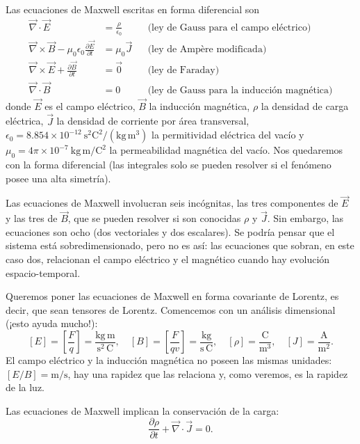 Las ecuaciones de Maxwell escritas en forma diferencial son
\[
\begin{aligned}
\vec\nabla\cdot\vec E &= \frac{\rho}{\epsilon_0} &&\text{(ley de Gauss
para el campo eléctrico)}\\
\vec\nabla\times\vec B-\mu_0\epsilon_0\frac{\partial\vec E}{\partial t}
&= \mu_0\vec J &&\text{(ley de Ampère modificada)}\\
\vec\nabla\times\vec E+\frac{\partial\vec B}{\partial t} &= \vec 0
&&\text{(ley de Faraday)}\\
\vec\nabla\cdot\vec B &= 0 &&\text{(ley de Gauss para la inducción
magnética)}
\end{aligned} \tag{23}
\]
donde $\vec E$ es el campo eléctrico, $\vec B$ la inducción magnética,
$\rho$ la densidad de carga eléctrica, $\vec J$ la densidad de corriente
por área transversal, $\epsilon_0=8.854\times10^{-12}\ \text{s}^2\text{C}^2/
(\text{kg}\,\text{m}^3)$ la permitividad eléctrica del vacío y
$\mu_0=4\pi\times10^{-7}\ \text{kg}\,\text{m}/\text{C}^2$ la
permeabilidad magnética del vacío. Nos quedaremos con la forma
diferencial (las integrales solo se pueden resolver si el fenómeno posee
una alta simetría).

Las ecuaciones de Maxwell involucran seis incógnitas, las tres
componentes de $\vec E$ y las tres de $\vec B$, que se pueden resolver si
son conocidas $\rho$ y $\vec J$. Sin embargo, las ecuaciones son ocho
(dos vectoriales y dos escalares). Se podría pensar que el sistema está
sobredimensionado, pero no es así: las ecuaciones que sobran, en este
caso dos, relacionan el campo eléctrico y el magnético cuando hay
evolución espacio-temporal.

Queremos poner las ecuaciones de Maxwell en forma covariante de Lorentz,
es decir, que sean tensores de Lorentz. Comencemos con un análisis
dimensional (¡esto ayuda mucho!):
\[
[E]=\left[\frac Fq\right]=\frac{\text{kg}\,\text{m}}{\text{s}^2\,
\text{C}}, \quad [B]=\left[\frac{F}{qv}\right]=\frac{\text{kg}}{\text{s}\,
\text{C}}, \quad [\rho]=\frac{\text{C}}{\text{m}^3}, \quad [J]=\frac{
\text{A}}{\text{m}^2}.
\]
El campo eléctrico y la inducción magnética no poseen las mismas
unidades: $[E/B]=\text{m/s}$, hay una rapidez que las relaciona y, como
veremos, es la rapidez de la luz.

\begin{proposicionc}
Las ecuaciones de Maxwell implican la conservación de la carga:
\[
\frac{\partial\rho}{\partial t}+\vec\nabla\cdot\vec J=0 . \tag{26}
\]
\end{proposicionc}

